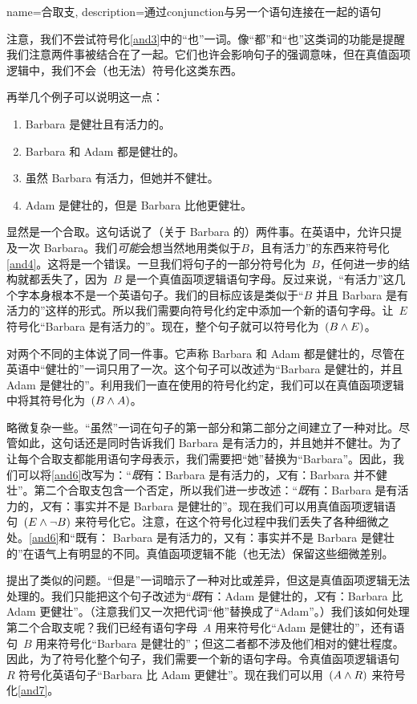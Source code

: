 {
name=合取支,
description={通过\gls{conjunction}与另一个语句连接在一起的语句}
}

注意，我们不尝试符号化\cref*{and3}中的“也”一词。像“都”和“也”这类词的功能是提醒我们注意两件事被结合在了一起。它们也许会影响句子的强调意味，但在真值函项逻辑中，我们不会（也无法）符号化这类东西。

再举几个例子可以说明这一点：


\begin{enumerate}
		\item\label{and4} Barbara 是健壮且有活力的。
		\item\label{and5} Barbara 和 Adam 都是健壮的。
		\item\label{and6} 虽然 Barbara 有活力，但她并不健壮。
	\item\label{and7} Adam 是健壮的，但是 Barbara 比他更健壮。
	\end{enumerate}


显然是一个合取。这句话说了（关于 Barbara 的）两件事。在英语中，允许只提及一次 Barbara。我们\emph{可能}会想当然地用类似于$B$，且有活力”的东西来符号化\cref*{and4}。这将是一个错误。一旦我们将句子的一部分符号化为~$B$，任何进一步的结构就都丢失了，因为~$B$ 是一个真值函项逻辑语句字母。反过来说，“有活力”这几个字本身根本不是一个英语句子。我们的目标应该是类似于“$B$ 并且 Barbara 是有活力的”这样的形式。所以我们需要向符号化约定中添加一个新的语句字母。让~$E$ 符号化“Barbara 是有活力的”。现在，整个句子就可以符号化为~$(B\wedge E)$。

对两个不同的主体说了同一件事。它声称 Barbara 和 Adam 都是健壮的，尽管在英语中“健壮的”一词只用了一次。这个句子可以改述为“Barbara 是健壮的，并且 Adam 是健壮的”。利用我们一直在使用的符号化约定，我们可以在真值函项逻辑中将其符号化为~$(B\wedge A)$。

略微复杂一些。“虽然”一词在句子的第一部分和第二部分之间建立了一种对比。尽管如此，这句话还是同时告诉我们 Barbara 是有活力的，并且她并不健壮。为了让每个合取支都能用语句字母表示，我们需要把“她”替换为“Barbara”。因此，我们可以将\cref*{and6}改写为：“\emph{既}有：Barbara 是有活力的，\emph{又}有：Barbara 并不健壮”。第二个合取支包含一个否定，所以我们进一步改述：“\emph{既}有：Barbara 是有活力的，\emph{又}有：事实并不是 Barbara 是健壮的”。现在我们可以用真值函项逻辑语句~$(E\wedge\neg B)$ 来符号化它。注意，在这个符号化过程中我们丢失了各种细微之处。\cref*{and6}和“既有： Barbara 是有活力的，又有：事实并不是 Barbara 是健壮的”在语气上有明显的不同。真值函项逻辑不能（也无法）保留这些细微差别。

提出了类似的问题。“但是”一词暗示了一种对比或差异，但这是真值函项逻辑无法处理的。我们只能把这个句子改述为“\emph{既}有：Adam 是健壮的，\emph{又}有：Barbara 比 Adam 更健壮”。（注意我们又一次把代词“他”替换成了“Adam”。）我们该如何处理第二个合取支呢？我们已经有语句字母~$A$ 用来符号化“Adam 是健壮的”，还有语句~$B$ 用来符号化“Barbara 是健壮的”；但这二者都不涉及他们相对的健壮程度。因此，为了符号化整个句子，我们需要一个新的语句字母。令真值函项逻辑语句~$R$ 符号化英语句子“Barbara 比 Adam 更健壮”。现在我们可以用~$(A \wedge R)$ 来符号化\cref*{and7}。

